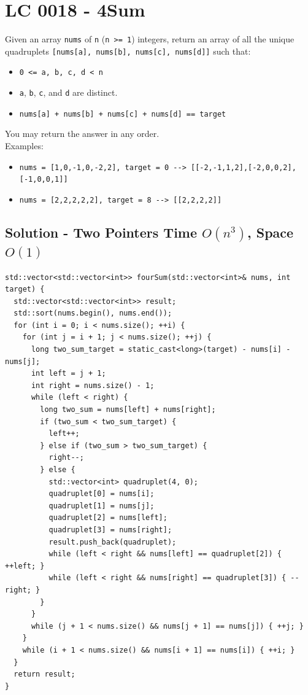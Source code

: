 \section{LC 0018 - 4Sum}\label{lc0018}
Given an array {\colorbox{CodeBackground}{\lstinline|nums|}} of {\colorbox{CodeBackground}{\lstinline|n|}} ({\colorbox{CodeBackground}{\lstinline|n >= 1|}}) integers, return an array of all the unique quadruplets {\colorbox{CodeBackground}{\lstinline|[nums[a], nums[b], nums[c], nums[d]]|}} such that:
\begin{itemize}
\item {\colorbox{CodeBackground}{\lstinline|0 <= a, b, c, d < n|}}
\item {\colorbox{CodeBackground}{\lstinline|a|}}, {\colorbox{CodeBackground}{\lstinline|b|}}, {\colorbox{CodeBackground}{\lstinline|c|}}, and {\colorbox{CodeBackground}{\lstinline|d|}} are distinct.
\item {\colorbox{CodeBackground}{\lstinline|nums[a] + nums[b] + nums[c] + nums[d] == target|}}
\end{itemize}

You may return the answer in any order.\\

Examples:
\begin{itemize}
\item {\colorbox{CodeBackground}{\lstinline|nums = [1,0,-1,0,-2,2], target = 0 --> [[-2,-1,1,2],[-2,0,0,2],[-1,0,0,1]]|}}
\item {\colorbox{CodeBackground}{\lstinline|nums = [2,2,2,2,2], target = 8 --> [[2,2,2,2]]|}}
\end{itemize}

\subsection*{Solution - Two Pointers {\scriptsize\color{gray}\Coffeecup\hspace{1mm}Time $O(n^3)$, Space $O(1)$}}
\begin{lstlisting}
std::vector<std::vector<int>> fourSum(std::vector<int>& nums, int target) {
  std::vector<std::vector<int>> result;
  std::sort(nums.begin(), nums.end());
  for (int i = 0; i < nums.size(); ++i) {
    for (int j = i + 1; j < nums.size(); ++j) {
      long two_sum_target = static_cast<long>(target) - nums[i] - nums[j];
      int left = j + 1;
      int right = nums.size() - 1;
      while (left < right) {
        long two_sum = nums[left] + nums[right];
        if (two_sum < two_sum_target) {
          left++;
        } else if (two_sum > two_sum_target) {
          right--;
        } else {
          std::vector<int> quadruplet(4, 0);
          quadruplet[0] = nums[i];
          quadruplet[1] = nums[j];
          quadruplet[2] = nums[left];
          quadruplet[3] = nums[right];
          result.push_back(quadruplet);
          while (left < right && nums[left] == quadruplet[2]) { ++left; }
          while (left < right && nums[right] == quadruplet[3]) { --right; }
        }
      }
      while (j + 1 < nums.size() && nums[j + 1] == nums[j]) { ++j; }
    }
    while (i + 1 < nums.size() && nums[i + 1] == nums[i]) { ++i; }
  }
  return result;
}
\end{lstlisting}

